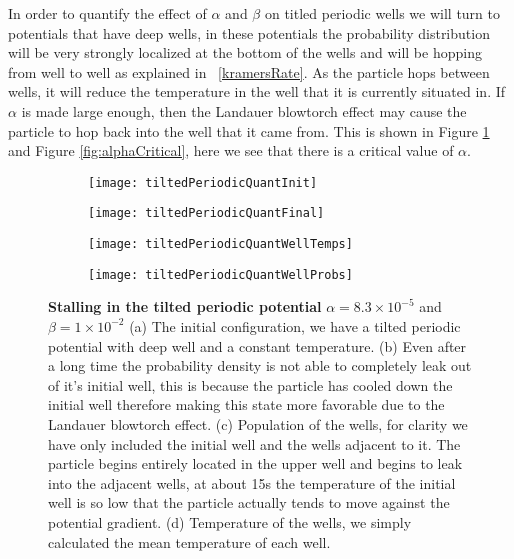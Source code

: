 In order to quantify the effect of $\alpha$ and $\beta$ on titled periodic wells we will turn to potentials that have deep wells, in these potentials the probability distribution will be very strongly localized at the bottom of the wells and will be hopping from well to well as explained in ~\autoref{kramersRate}. As the particle hops between wells, it will reduce the temperature in the well that it is currently situated in. If $\alpha$ is made large enough, then the Landauer blowtorch effect may cause the particle to hop back into the well that it came from. This is shown in Figure \ref{fig:tiltedPeriodicQuant} and Figure \ref{fig:alphaCritical}, here we see that there is a critical value of $\alpha$.
\begin{figure}
	\begin{subfigure}{0.49\textwidth}
		\texttt{[image: tiltedPeriodicQuantInit]}
		\caption{}
	\end{subfigure}
	\begin{subfigure}{0.49\textwidth}
		\texttt{[image: tiltedPeriodicQuantFinal]}
		\caption{}
	\end{subfigure}
	\begin{subfigure}{0.49\textwidth}
		\texttt{[image: tiltedPeriodicQuantWellTemps]}
		\caption{}
	\end{subfigure}
	\begin{subfigure}{0.49\textwidth}
		\texttt{[image: tiltedPeriodicQuantWellProbs]}
		\caption{}
	\end{subfigure}
	\caption{\textbf{Stalling in the tilted periodic potential} $\alpha = 8.3 \times 10^{-5}$ and $\beta = 1 \times 10^{-2}$ (a) The initial configuration, we have a tilted periodic potential with deep well and a constant temperature. (b) Even after a long time the probability density is not able to completely leak out of it's initial well, this is because the particle has cooled down the initial well therefore making this state more favorable due to the Landauer blowtorch effect. (c) Population of the wells, for clarity we have only included the initial well and the wells adjacent to it. The particle begins entirely located in the upper well and begins to leak into the adjacent wells, at about 15s the temperature of the initial well is so low that the particle actually tends to move against the potential gradient. (d) Temperature of the wells, we simply calculated the mean temperature of each well. \label{fig:tiltedPeriodicQuant}}
\end{figure}
